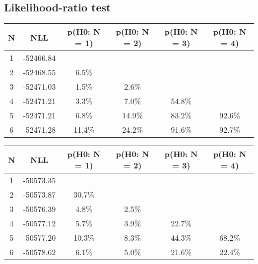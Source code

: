 \subsection{Likelihood-ratio test}
\begin{table}[htb]
	\begin{center}
{\footnotesize\renewcommand{\arraystretch}{1.4}
		\begin{tabular}{cc||cccc}
			N & NLL & p(H0: N = 1) & p(H0: N = 2) & p(H0: N = 3) & p(H0: N = 4)\\ 
		\hline
1 & -52466.84 & & & & \\
2 & -52468.55 & 6.5\% & & & \\
3 & -52471.03 & 1.5\% & 2.6\% & & \\
4 & -52471.21 & 3.3\% & 7.0\% & 54.8\% & \\
5 & -52471.21 & 6.8\% & 14.9\% & 83.2\% & 92.6\% \\
6 & -52471.28 & 11.4\% & 24.2\% & 91.6\% & 92.7\% \\
	\end{tabular}
		\label{tab:lab}
	}
	\end{center}\end{table}

\begin{table}[htb]
	\begin{center}
{\footnotesize\renewcommand{\arraystretch}{1.4}
		\begin{tabular}{cc||cccc}
			N & NLL & p(H0: N = 1) & p(H0: N = 2) & p(H0: N = 3) & p(H0: N = 4)\\ 
		\hline
1 & -50573.35 & & & & \\
2 & -50573.87 & 30.7\% & & & \\
3 & -50576.39 & 4.8\% & 2.5\% & & \\
4 & -50577.12 & 5.7\% & 3.9\% & 22.7\% & \\
5 & -50577.20 & 10.3\% & 8.3\% & 44.3\% & 68.2\% \\
6 & -50578.62 & 6.1\% & 5.0\% & 21.6\% & 22.4\% \\
	\end{tabular}
		\label{tab:lab}
	}
	\end{center}\end{table}

